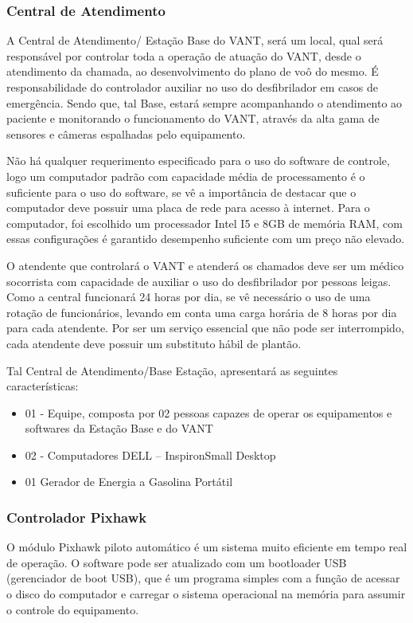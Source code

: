 \subsubsection{Central de Atendimento}
A Central de Atendimento/ Estação Base do VANT, será um local, qual será responsável por controlar toda a operação de atuação do VANT, desde o atendimento da chamada, ao desenvolvimento do plano de voô do mesmo. É responsabilidade do controlador auxiliar no uso do desfibrilador em casos de emergência. Sendo que, tal Base, estará sempre acompanhando o atendimento ao paciente e monitorando o funcionamento do VANT, através da alta gama de sensores e câmeras espalhadas pelo equipamento.

Não há qualquer requerimento especificado para o uso do software de controle, logo um computador padrão com capacidade média de processamento é o suficiente para o uso do software, se vê a importância de destacar que o computador deve possuir uma placa de rede para acesso à internet. Para o computador, foi escolhido um processador Intel I5 e 8GB de memória RAM, com essas configurações é garantido desempenho suficiente com um preço não elevado.  

O atendente que controlará o VANT e atenderá os chamados deve ser um médico socorrista com capacidade de auxiliar o uso do desfibrilador por pessoas leigas. Como a central funcionará 24 horas por dia, se vê necessário o uso de uma rotação de funcionários, levando em conta uma carga horária de 8 horas por dia para cada atendente. Por ser um serviço essencial que não pode ser interrompido, cada atendente deve possuir um substituto hábil de plantão.

Tal Central de Atendimento/Base Estação, apresentará as seguintes características:

\begin{itemize}
  \item 01 - Equipe, composta por 02 pessoas capazes de operar os equipamentos e softwares da Estação Base e do VANT
  \item 02 - Computadores DELL – InspironSmall Desktop \cite{DELL}
  \item 01 Gerador de Energia a Gasolina Portátil \cite{Gerador}
\end{itemize}


\subsubsection{Controlador Pixhawk}
O módulo Pixhawk piloto automático é um sistema muito eficiente em tempo real de operação. 
O software pode ser atualizado com um bootloader USB (gerenciador de boot USB), que é um programa simples com a 
função de acessar o disco do computador e carregar o sistema operacional na memória para assumir o controle do 
equipamento.

